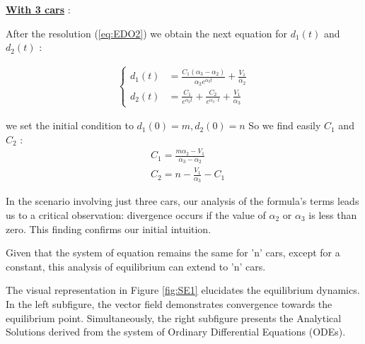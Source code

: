 \documentclass{article}
\begin{document}
		\textbf{\underline{With 3 cars}} : \newline\newline
		
		After the resolution (\ref{eq:EDO2}) we obtain the next equation for $d_1(t)$ and $d_2(t)$ : 
		
		\begin{align*}
			\begin{cases}
				d_1(t) &= \frac{C_1(\alpha_3-\alpha_2)}{\alpha_2e^{\alpha_2t}}+ \frac{V_1}{\alpha_2}\\
				d_2(t) &= \frac{C_1}{e^{\alpha_2t}} + \frac{C_2}{e^{\alpha_3 \cdot t}} + \frac{V_1}{\alpha_3}
			\end{cases}
		\end{align*}
		
		we set the initial condition to $d_1(0)=m, d_2(0)=n$ So we find easily $C_1$ and $C_2$ : 
		\begin{align*}
			&C_1=\frac{m\alpha_2-V_1}{\alpha_3-\alpha_2} \\
			&C_2=n-\frac{V_1}{\alpha_3} - C_1
		\end{align*}
		
		In the scenario involving just three cars, our analysis of the formula's terms leads us to a critical observation: divergence occurs if the value of $\alpha_2$ or $\alpha_3$ is less than zero. This finding confirms our initial intuition.
		
		Given that the system of equation remains the same for 'n' cars, except for a constant, this analysis of equilibrium can extend to 'n' cars.
		
		The visual representation in Figure \ref{fig:SE1} elucidates the equilibrium dynamics. In the left subfigure, the vector field demonstrates convergence towards the equilibrium point. Simultaneously, the right subfigure presents the Analytical Solutions derived from the system of Ordinary Differential Equations (ODEs).
		
\end{document}
